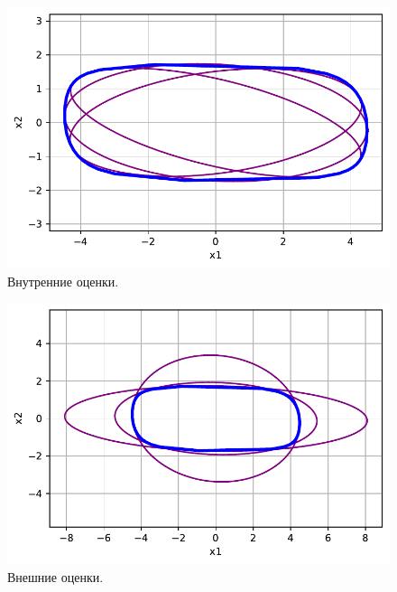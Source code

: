 \documentclass[16pt]{article}
\begin{document}
\newpage
\begin{figure}[h]
	\center
    \includegraphics[scale=0.75]{int.pdf}
    \caption{Внутренние оценки.}
\end{figure}

\begin{figure}[h]
	\center
    \includegraphics[scale=0.75]{ext.pdf}
    \caption{Внешние оценки.}
\end{figure}
\end{document}
